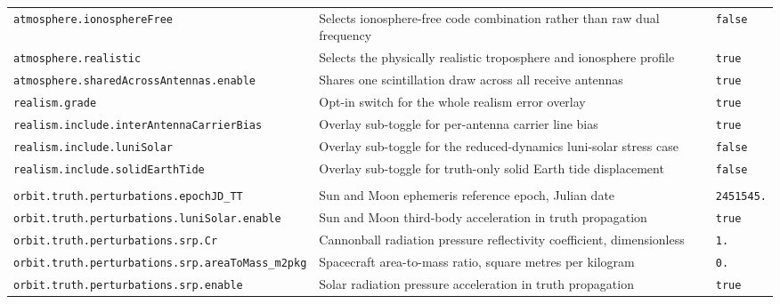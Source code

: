 \begin{center}
\begin{longtable}{>{\raggedright\arraybackslash\scriptsize\ttfamily}p{}|>{\raggedright\arraybackslash}p{}|>{\raggedright\arraybackslash\scriptsize\ttfamily}p{}}
\texttt{atmosphere.\allowbreak ionosphere\allowbreak Free} & Selects ionosphere-free code combination rather than raw dual frequency & \texttt{false} \\
\texttt{atmosphere.\allowbreak realistic} & Selects the physically realistic troposphere and ionosphere profile & \texttt{true} \\
\texttt{atmosphere.\allowbreak shared\allowbreak Across\allowbreak Antennas.\allowbreak enable} & Shares one scintillation draw across all receive antennas & \texttt{true} \\
\texttt{realism.\allowbreak grade} & Opt-in switch for the whole realism error overlay & \texttt{true} \\
\texttt{realism.\allowbreak include.\allowbreak inter\allowbreak Antenna\allowbreak Carrier\allowbreak Bias} & Overlay sub-toggle for per-antenna carrier line bias & \texttt{true} \\
\texttt{realism.\allowbreak include.\allowbreak luni\allowbreak Solar} & Overlay sub-toggle for the reduced-dynamics luni-solar stress case & \texttt{false} \\
\texttt{realism.\allowbreak include.\allowbreak solid\allowbreak Earth\allowbreak Tide} & Overlay sub-toggle for truth-only solid Earth tide displacement & \texttt{false} \\
\hline
\multicolumn{3}{l}{\textbf{Orbit and force model}} \\ \hline
\texttt{orbit.\allowbreak truth.\allowbreak perturbations.\allowbreak epoch\allowbreak JD\_\allowbreak TT} & Sun and Moon ephemeris reference epoch, Julian date & \texttt{2451545.\allowbreak 0} \\
\texttt{orbit.\allowbreak truth.\allowbreak perturbations.\allowbreak luni\allowbreak Solar.\allowbreak enable} & Sun and Moon third-body acceleration in truth propagation & \texttt{true} \\
\texttt{orbit.\allowbreak truth.\allowbreak perturbations.\allowbreak srp.\allowbreak Cr} & Cannonball radiation pressure reflectivity coefficient, dimensionless & \texttt{1.\allowbreak 3} \\
\texttt{orbit.\allowbreak truth.\allowbreak perturbations.\allowbreak srp.\allowbreak area\allowbreak To\allowbreak Mass\_\allowbreak m2pkg} & Spacecraft area-to-mass ratio, square metres per kilogram & \texttt{0.\allowbreak 02} \\
\texttt{orbit.\allowbreak truth.\allowbreak perturbations.\allowbreak srp.\allowbreak enable} & Solar radiation pressure acceleration in truth propagation & \texttt{true} \\

\end{longtable}
\end{center}
